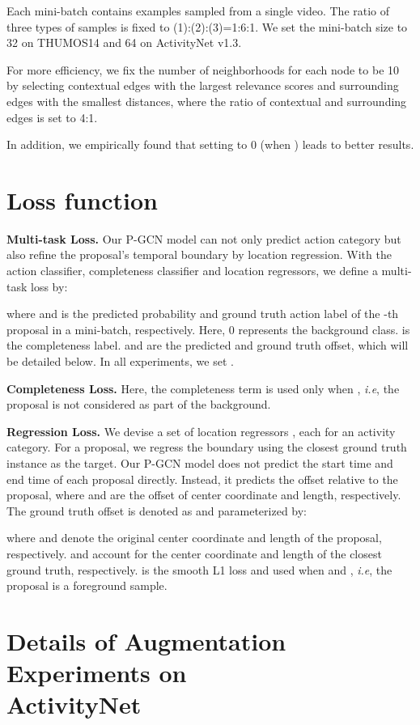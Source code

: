 \documentclass[10pt,twocolumn,letterpaper]{article}
\def\ie{\emph{i.e}\onedot} \def\Ie{\emph{I.e}\onedot}
\begin{document}
Each mini-batch contains examples sampled from a single video. The ratio of three types of samples is fixed to (1):(2):(3)=1:6:1. We set the mini-batch size to 32 on THUMOS14 and 64 on ActivityNet v1.3.

For more efficiency, we
fix the number of neighborhoods for each node to be 10 by
selecting contextual edges with the largest relevance scores
and surrounding edges with the smallest distances, where
the ratio of contextual and surrounding edges is set to 4:1.

In addition, we empirically found that setting  to 0 (when  ) leads to better results.



\section{Loss function}
\noindent \textbf{Multi-task Loss.}
Our P-GCN model can not only predict action category but also refine the proposal’s temporal boundary by location regression. With the action classifier, completeness classifier and location regressors, we define a multi-task loss by:

where  and  is the predicted probability and ground truth action label of the -th proposal in a mini-batch, respectively. Here, 0 represents the background class.  is the completeness label.   and  are the predicted and ground truth offset, which will be detailed below. In all experiments, we set .

\noindent \textbf{Completeness Loss.}
Here, the completeness term  is used only when , \ie, the proposal is not considered as part of the background.

\noindent \textbf{Regression Loss.}
We devise a set of location regressors , each for an activity category. For a proposal, we regress the boundary using the closest ground truth instance as the target. Our P-GCN model does not predict the start time and end time of each proposal directly. Instead, it predicts the offset  relative to the proposal, where  and  are the offset of center coordinate and length, respectively. The ground truth offset is denoted as  and parameterized by:

where  and  denote the original center coordinate and length of the proposal, respectively.  and  account for the center coordinate and length of the closest ground truth, respectively.
 is the smooth L1 loss and used when  and , \ie, the proposal is a foreground sample.

\section{Details of Augmentation Experiments on \\ActivityNet}
\end{document}
